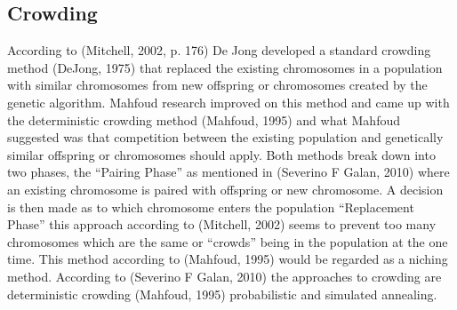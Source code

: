 \subsection{Crowding}
According to (Mitchell, 2002, p. 176) De Jong developed a standard crowding method (DeJong, 1975) that replaced the existing chromosomes in a population with similar chromosomes from new offspring or chromosomes created by the genetic algorithm.  Mahfoud research improved on this method and came up with the deterministic crowding method (Mahfoud, 1995) and what Mahfoud suggested was that competition between the existing population and genetically similar offspring or chromosomes should apply.  Both methods break down into two phases, the “Pairing Phase” as mentioned in (Severino F Galan, 2010) where an existing chromosome is paired with offspring or new chromosome.   A decision is then made as to which chromosome enters the population “Replacement Phase” this approach according to (Mitchell, 2002) seems to prevent too many chromosomes which are the same or “crowds” being in the population at the one time. This method according to (Mahfoud, 1995) would be regarded as a niching method. According to (Severino F Galan, 2010) the approaches to crowding are deterministic crowding (Mahfoud, 1995) probabilistic and simulated annealing.   